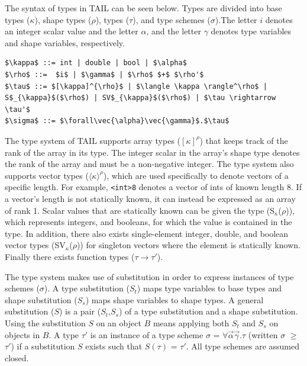\documentclass[11pt]{article}
\begin{document}
The syntax of types in TAIL can be seen below. Types are divided into base types ($\kappa$), shape types ($\rho$), types ($\tau$), and type schemes ($\sigma$).The letter $i$ denotes an integer scalar value and the letter $\alpha$, and the letter $\gamma$ denotes type variables and shape variables, respectively.
\begin{lstlisting}[numbers=none,frame=none]
$\kappa$ ::= int | double | bool | $\alpha$
$\rho$ ::=  $i$ | $\gamma$ | $\rho$ $+$ $\rho'$
$\tau$ ::= $[\kappa]^{\rho}$ | $\langle \kappa \rangle^\rho$ | S$_{\kappa}$($\rho$) | SV$_{\kappa}$($\rho$) | $\tau \rightarrow \tau'$
$\sigma$ ::= $\forall\vec{\alpha}\vec{\gamma}$.$\tau$
\end{lstlisting}
The type system of TAIL supports array types ($[\kappa]^{\rho}$) that keeps track of the rank of the array in its type.
The integer scalar in the array's shape type denotes the rank of the array and must be a non-negative integer.
The type system also supports vector types ($\langle \kappa \rangle^\rho$), which are used specifically to denote vectors of a specific length.
For example, {\tt <int>8} denotes a vector of ints of known length 8.
If a vector's length is not statically known, it can instead be expressed as an array of rank 1.
Scalar values that are statically known can be given the type (S$_{\kappa}$($\rho$)), which represents integers, and booleans,
for which the value is contained in the type.
In addition, there also exists single-element integer, double, and boolean vector types (SV$_{\kappa}$($\rho$)) for singleton vectors where the element is statically known.
Finally there exists function types ($\tau \rightarrow \tau'$).

The type system makes use of substitution in order to express instances of type schemes ($\sigma$).
A type substitution ($S_t$) maps type variables to base types and shape substitution ($S_s$) maps shape variables to shape types.
A general substitution ($S$) is a pair ($S_t$,$S_s$) of a type substitution and a shape substitution.
Using the substitution $S$ on an object $B$ means applying both $S_t$ and $S_s$ on objects in $B$.
A type $\tau'$ is an instance of a type scheme $\sigma$ = $\forall\vec{\alpha}\vec{\gamma}$.$\tau$ (written $\sigma$ $\geq$ $\tau'$) if a substitution $S$ exists such that $S(\tau)$ = $\tau'$. All type schemes are assumed closed.
\end{document}
